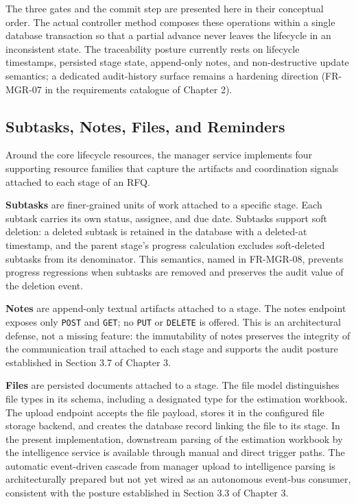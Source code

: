 The three gates and the commit step are presented here in their conceptual order. The actual controller method composes these operations within a single database transaction so that a partial advance never leaves the lifecycle in an inconsistent state. The traceability posture currently rests on lifecycle timestamps, persisted stage state, append-only notes, and non-destructive update semantics; a dedicated audit-history surface remains a hardening direction (FR-MGR-07 in the requirements catalogue of Chapter 2).

\subsection{Subtasks, Notes, Files, and Reminders}
Around the core lifecycle resources, the manager service implements four supporting resource families that capture the artifacts and coordination signals attached to each stage of an RFQ.

\textbf{Subtasks} are finer-grained units of work attached to a specific stage. Each subtask carries its own status, assignee, and due date. Subtasks support soft deletion: a deleted subtask is retained in the database with a deleted-at timestamp, and the parent stage's progress calculation excludes soft-deleted subtasks from its denominator. This semantics, named in FR-MGR-08, prevents progress regressions when subtasks are removed and preserves the audit value of the deletion event.

\textbf{Notes} are append-only textual artifacts attached to a stage. The notes endpoint exposes only \texttt{POST} and \texttt{GET}; no \texttt{PUT} or \texttt{DELETE} is offered. This is an architectural defense, not a missing feature: the immutability of notes preserves the integrity of the communication trail attached to each stage and supports the audit posture established in Section 3.7 of Chapter 3.

\textbf{Files} are persisted documents attached to a stage. The file model distinguishes file types in its schema, including a designated type for the estimation workbook. The upload endpoint accepts the file payload, stores it in the configured file storage backend, and creates the database record linking the file to its stage. In the present implementation, downstream parsing of the estimation workbook by the intelligence service is available through manual and direct trigger paths. The automatic event-driven cascade from manager upload to intelligence parsing is architecturally prepared but not yet wired as an autonomous event-bus consumer, consistent with the posture established in Section 3.3 of Chapter 3.

